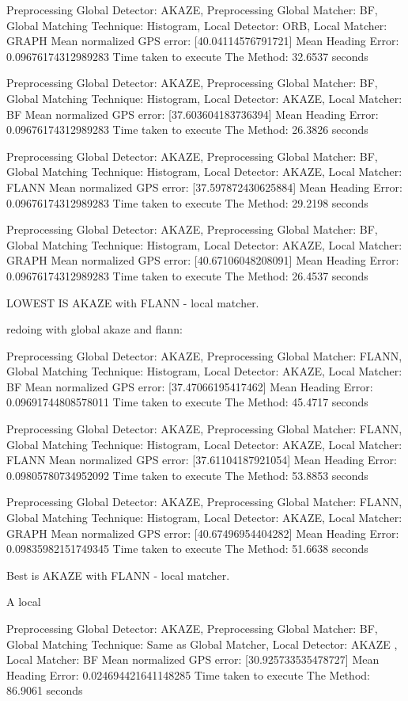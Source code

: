 Preprocessing Global Detector: AKAZE, Preprocessing Global Matcher: BF, Global Matching Technique: Histogram, Local Detector: ORB, Local Matcher: GRAPH
Mean normalized GPS error: [40.04114576791721]
Mean Heading Error: 0.09676174312989283
Time taken to execute The Method: 32.6537 seconds


Preprocessing Global Detector: AKAZE, Preprocessing Global Matcher: BF, Global Matching Technique: Histogram, Local Detector: AKAZE, Local Matcher: BF
Mean normalized GPS error: [37.603604183736394]
Mean Heading Error: 0.09676174312989283
Time taken to execute The Method: 26.3826 seconds

Preprocessing Global Detector: AKAZE, Preprocessing Global Matcher: BF, Global Matching Technique: Histogram, Local Detector: AKAZE, Local Matcher: FLANN
Mean normalized GPS error: [37.597872430625884]
Mean Heading Error: 0.09676174312989283
Time taken to execute The Method: 29.2198 seconds


Preprocessing Global Detector: AKAZE, Preprocessing Global Matcher: BF, Global Matching Technique: Histogram, Local Detector: AKAZE, Local Matcher: GRAPH
Mean normalized GPS error: [40.67106048208091]
Mean Heading Error: 0.09676174312989283
Time taken to execute The Method: 26.4537 seconds

LOWEST IS AKAZE with FLANN - local matcher. 

redoing with global akaze and flann:

Preprocessing Global Detector: AKAZE, Preprocessing Global Matcher: FLANN, Global Matching Technique: Histogram, Local Detector: AKAZE, Local Matcher: BF
Mean normalized GPS error: [37.47066195417462]
Mean Heading Error: 0.09691744808578011
Time taken to execute The Method: 45.4717 seconds


Preprocessing Global Detector: AKAZE, Preprocessing Global Matcher: FLANN, Global Matching Technique: Histogram, Local Detector: AKAZE, Local Matcher: FLANN
Mean normalized GPS error: [37.61104187921054]
Mean Heading Error: 0.09805780734952092
Time taken to execute The Method: 53.8853 seconds



Preprocessing Global Detector: AKAZE, Preprocessing Global Matcher: FLANN, Global Matching Technique: Histogram, Local Detector: AKAZE, Local Matcher: GRAPH
Mean normalized GPS error: [40.67496954404282]
Mean Heading Error: 0.09835982151749345
Time taken to execute The Method: 51.6638 seconds

Best is AKAZE with FLANN - local matcher.


A local 

Preprocessing Global Detector: AKAZE, Preprocessing Global Matcher: BF, Global Matching Technique: Same as Global Matcher, Local Detector: AKAZE , Local Matcher: BF
Mean normalized GPS error: [30.925733535478727]
Mean Heading Error: 0.024694421641148285
Time taken to execute The Method: 86.9061 seconds